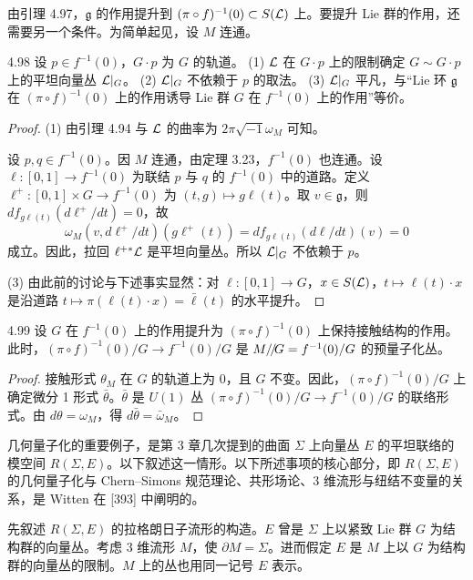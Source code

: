 由引理 4.97，$\mathfrak{g}$ 的作用提升到 $(\pi\circ f)^{-1}(0)\subset S(\mathcal{L})$ 上。要提升 Lie 群的作用，还需要另一个条件。为简单起见，设 $M$ 连通。

\begin{lemma*}{4.98}
  设 $p\in f^{-1}(0)$，$G\cdot p$ 为 $G$ 的轨道。
  (1) $\mathcal{L}$ 在 $G\cdot p$ 上的限制确定 $G\sim G\cdot p$ 上的平坦向量丛 $\mathcal{L}|_G$。
  (2) $\mathcal{L}|_G$ 不依赖于 $p$ 的取法。
  (3) $\mathcal{L}|_G$ 平凡，与“Lie 环 $\mathfrak{g}$ 在 $(\pi\circ f)^{-1}(0)$ 上的作用诱导 Lie 群 $G$ 在 $f^{-1}(0)$ 上的作用”等价。
\end{lemma*}

\begin{proof}
  (1) 由引理 4.94 与 $\mathcal{L}$ 的曲率为 $2\pi\sqrt{-1}\omega_M$ 可知。

  设 $p,q\in f^{-1}(0)$。因 $M$ 连通，由定理 3.23，$f^{-1}(0)$ 也连通。设 $\ell:[0,1]\to f^{-1}(0)$ 为联结 $p$ 与 $q$ 的 $f^{-1}(0)$ 中的道路。定义 $\ell^+:[0,1]\times G\to f^{-1}(0)$ 为 $(t,g)\mapsto g\ell(t)$。取 $v\in\mathfrak{g}$，则 $df_{g\ell(t)}(d\ell^+/dt)=0$，故
  \[
    \omega_M(v,d\ell^+/dt)(g\ell^+(t))=df_{g\ell(t)}(d\ell/dt)(v)=0
  \]
  成立。因此，拉回 $\ell^{+*}\mathcal{L}$ 是平坦向量丛。所以 $\mathcal{L}|_G$ 不依赖于 $p$。

  (3) 由此前的讨论与下述事实显然：对 $\ell:[0,1]\to G$，$x\in S(\mathcal{L})$，$t\mapsto\ell(t)\cdot x$ 是沿道路 $t\mapsto\pi(\ell(t)\cdot x)=\bar\ell(t)$ 的水平提升。
\end{proof}

\begin{proposition*}{4.99}
  设 $G$ 在 $f^{-1}(0)$ 上的作用提升为 $(\pi\circ f)^{-1}(0)$ 上保持接触结构的作用。此时，$(\pi\circ f)^{-1}(0)/G\to f^{-1}(0)/G$ 是 ${M}/\!/\!{G}=f^{-1}(0)/G$ 的预量子化丛。
\end{proposition*}

\begin{proof}
  接触形式 $\theta_M$ 在 $G$ 的轨道上为 0，且 $G$ 不变。因此，$(\pi\circ f)^{-1}(0)/G$ 上确定微分 1 形式 $\bar\theta$。$\bar\theta$ 是 $U(1)$ 丛 $(\pi\circ f)^{-1}(0)/G\to f^{-1}(0)/G$ 的联络形式。由 $d\theta=\omega_M$，得 $d\bar\theta=\bar\omega_M$。
\end{proof}

几何量子化的重要例子，是第 3 章几次提到的曲面 $\Sigma$ 上向量丛 $E$ 的平坦联络的模空间 $R(\Sigma,E)$。以下叙述这一情形。以下所述事项的核心部分，即 $R(\Sigma,E)$ 的几何量子化与 Chern–Simons 规范理论、共形场论、3 维流形与纽结不变量的关系，是 Witten 在 [393] 中阐明的。

先叙述 $R(\Sigma,E)$ 的拉格朗日子流形的构造。$E$ 曾是 $\Sigma$ 上以紧致 Lie 群 $G$ 为结构群的向量丛。考虑 3 维流形 $M$，使 $\partial M=\Sigma$。进而假定 $E$ 是 $M$ 上以 $G$ 为结构群的向量丛的限制。$M$ 上的丛也用同一记号 $E$ 表示。


